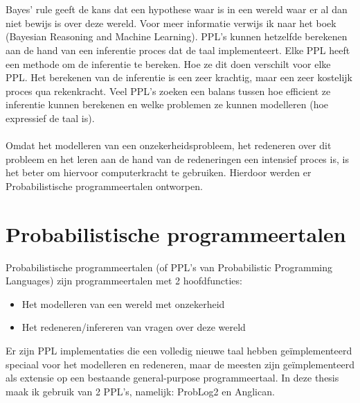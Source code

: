 \documentclass[12pt,a4paper,oneside]{book}
\begin{document}
\\\\
Bayes' rule geeft de kans dat een hypothese waar is in een wereld waar er al dan niet bewijs is over deze wereld. Voor meer informatie verwijs ik naar het boek (Bayesian Reasoning and Machine Learning). PPL's kunnen hetzelfde berekenen aan de hand van een inferentie proces dat de taal implementeert. Elke PPL heeft een methode om de inferentie te bereken. Hoe ze dit doen verschilt voor elke PPL.
Het berekenen van de inferentie is een zeer krachtig, maar een zeer kostelijk proces qua rekenkracht. Veel PPL's zoeken een balans tussen hoe efficient ze inferentie kunnen berekenen en welke problemen ze kunnen modelleren (hoe expressief de taal is).
\\\\
Omdat het modelleren van een onzekerheidsprobleem, het redeneren over dit probleem en het leren aan de hand van de redeneringen een intensief proces is, is het beter om hiervoor computerkracht te gebruiken. Hierdoor werden er Probabilistische programmeertalen ontworpen.

\section{Probabilistische programmeertalen}
Probabilistische programmeertalen (of PPL's van Probabilistic Programming Languages) zijn programmeertalen met 2 hoofdfuncties:
\begin{itemize}
	\item Het modelleren van een wereld met onzekerheid
	\item Het redeneren/infereren van vragen over deze wereld
\end{itemize}
Er zijn PPL implementaties die een volledig nieuwe taal hebben geïmplementeerd speciaal voor het modelleren en redeneren, maar de meesten zijn geïmplementeerd als extensie op een bestaande general-purpose programmeertaal. In deze thesis maak ik gebruik van 2 PPL’s, namelijk: ProbLog2 en Anglican.
\end{document}
